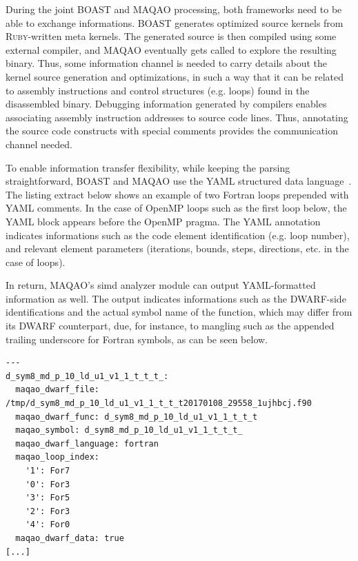 \documentclass[11pt, a4paper, twoside]{montblanc2}
\def\ruby{\textsc{Ruby}\xspace}
\begin{document}

During the joint BOAST and MAQAO processing, both frameworks need to be able to exchange 
informations. BOAST generates optimized source kernels from \ruby-written meta kernels. The generated 
source is then compiled using some external compiler, and MAQAO eventually gets called to explore the 
resulting binary. Thus, some information channel is needed to carry details about the kernel source 
generation and optimizations, in such a way that it can be related to assembly instructions and 
control structures (e.g. loops) found in the disassembled binary. Debugging information generated by 
compilers enables associating assembly instruction addresses to source code lines. Thus, annotating 
the source code constructs with special comments provides the communication channel needed.

To enable information transfer flexibility, while keeping the parsing straightforward, BOAST and 
MAQAO use the YAML structured data language~\cite{yaml:2017}. The listing extract below shows an 
example of two Fortran loops prepended with YAML comments. In the case of OpenMP loops such as the 
first loop below, the YAML block appears before the OpenMP pragma. The YAML annotation indicates 
informations such as the code element identification (e.g. loop number), and relevant element 
parameters (iterations, bounds, steps, directions, etc. in the case of loops).



In return, MAQAO's simd analyzer module can output YAML-formatted information
as well. The output indicates informations such as the DWARF-side
identifications and the actual symbol name of the function, which may differ from
its DWARF counterpart, due, for instance, to mangling such as the appended
trailing underscore for Fortran symbols, as can be seen below.

\begin{verbatim}
---
d_sym8_md_p_10_ld_u1_v1_1_t_t_t_:
  maqao_dwarf_file: /tmp/d_sym8_md_p_10_ld_u1_v1_1_t_t_t20170108_29558_1ujhbcj.f90
  maqao_dwarf_func: d_sym8_md_p_10_ld_u1_v1_1_t_t_t
  maqao_symbol: d_sym8_md_p_10_ld_u1_v1_1_t_t_t_
  maqao_dwarf_language: fortran
  maqao_loop_index:
    '1': For7
    '0': For3
    '3': For5
    '2': For3
    '4': For0
  maqao_dwarf_data: true
[...]
\end{verbatim}
\end{document}
